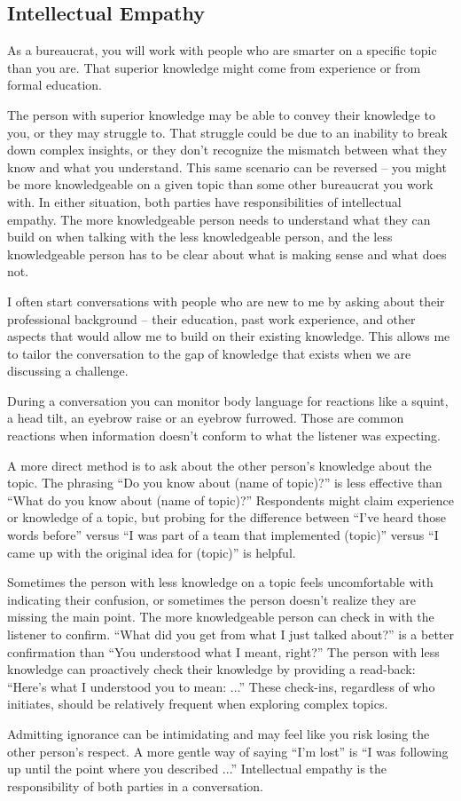 \subsection{Intellectual Empathy}

As a bureaucrat, you will work with people who are smarter on a specific topic than you are. That superior knowledge might come from experience or from formal education. 

The person with superior knowledge may be able to convey their knowledge to you, or they may struggle to. That struggle could be due to an inability to break down complex insights, or they don't recognize the mismatch between what they know and what you understand. 
This same scenario can be reversed -- you might be more knowledgeable on a given topic than some other bureaucrat you work with. In either situation, both parties have responsibilities of intellectual empathy. The more knowledgeable person needs to understand what they can build on when talking with the less knowledgeable person, and the less knowledgeable person has to be clear about what is making sense and what does not. 

I often start conversations with people who are new to me by asking about their professional background -- their education, past work experience, and other aspects that would allow me to build on their existing knowledge. This allows me to tailor the conversation to the gap of knowledge that exists when we are discussing a challenge. 

During a conversation you can monitor body language for reactions like a squint, a head tilt, an eyebrow raise or an eyebrow furrowed. Those are common reactions when information doesn't conform to what the listener was expecting. 

A more direct method is to ask about the other person's knowledge about the topic. The phrasing ``Do you know about (name of topic)?'' is less effective than ``What do you know about (name of topic)?'' Respondents might claim experience or knowledge of a topic, but probing for the difference between ``I've heard those words before'' versus ``I was part of a team that implemented (topic)'' versus ``I came up with the original idea for (topic)'' is helpful. 

Sometimes the person with less knowledge on a topic feels uncomfortable with indicating their confusion, or sometimes the person doesn't realize they are missing the main point. The more knowledgeable person can check in with the listener to confirm. ``What did you get from what I just talked about?'' is a better confirmation than ``You understood what I meant, right?'' The person with less knowledge can proactively check their knowledge by providing a read-back: ``Here's what I understood you to mean: ...'' These check-ins, regardless of who initiates, should be relatively frequent when exploring complex topics. 

Admitting ignorance can be intimidating and may feel like you risk losing the other person's respect. A more gentle way of saying ``I'm lost'' is ``I was following up until the point where you described ...'' Intellectual empathy is the responsibility of both parties in a conversation. 